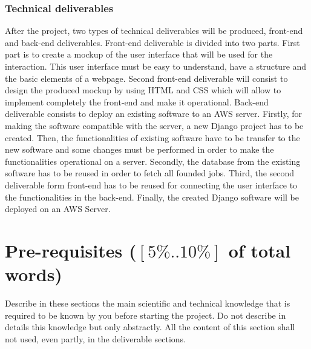 \documentclass[conference,compsoc]{IEEEtran}
\begin{document}
\subsubsection{Technical deliverables}
After the project, two types of technical deliverables will be produced, front-end and back-end deliverables. 
Front-end deliverable is divided into two parts. First part is to create a mockup of the user interface that will be used for the interaction. This user interface must be easy to understand, have a structure and the basic elements of a webpage.  Second front-end deliverable will consist to design the produced mockup by using HTML and CSS which will allow to implement completely the front-end and make it operational. 
Back-end deliverable consists to deploy an existing software to an AWS server. Firstly, for making the software compatible with the server, a new Django project has to be created. Then, the functionalities of existing software have to be transfer to the new software and some changes must be performed in order to make the functionalities operational on a server. Secondly, the database from the existing software has to be reused in order to fetch all founded jobs. Third, the second deliverable form front-end has to be reused for connecting the user interface to the functionalities in the back-end. Finally, the created Django software will be deployed on an AWS Server. 
 



\section{Pre-requisites ($[5\%..10\%]$ of total words)} 
Describe in these sections the main scientific and technical knowledge that is required to be known by you before starting the project.
Do not describe in details this knowledge but only abstractly. All the content of this section shall not used, even partly, in the deliverable sections.
\end{document}
